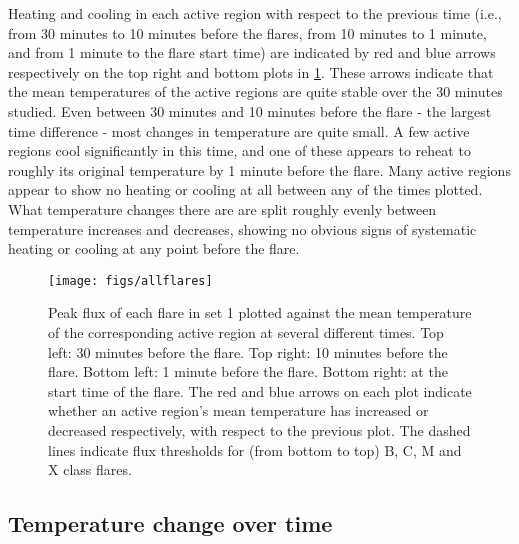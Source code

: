 \documentclass{article}
\begin{document}
Heating and cooling in each active region with respect to the previous
time (i.e., from 30 minutes to 10 minutes before the flares, from
10 minutes to 1 minute, and from 1 minute to the flare start time)
are indicated by red and blue arrows respectively on the top right
and bottom plots in \ref{fig:flux-v-temp}. These arrows indicate
that the mean temperatures of the active regions are quite stable
over the 30 minutes studied. Even between 30 minutes and 10 minutes
before the flare - the largest time difference - most changes in temperature
are quite small. A few active regions cool significantly in this time,
and one of these appears to reheat to roughly its original temperature
by 1 minute before the flare. Many active regions appear to show no
heating or cooling at all between any of the times plotted. What temperature
changes there are are split roughly evenly between temperature increases
and decreases, showing no obvious signs of systematic heating or cooling
at any point before the flare.

\begin{figure}
\begin{centering}
\texttt{[image: figs/allflares]} 
\par\end{centering}

\caption{Peak flux of each flare in set 1 plotted against the mean temperature
of the corresponding active region at several different times. Top
left: 30 minutes before the flare. Top right: 10 minutes before the
flare. Bottom left: 1 minute before the flare. Bottom right: at the
start time of the flare. The red and blue arrows on each plot indicate
whether an active region's mean temperature has increased or decreased
respectively, with respect to the previous plot. The dashed lines
indicate flux thresholds for (from bottom to top) B, C, M and X class
flares. \label{fig:flux-v-temp}}
\end{figure}



\subsection{Temperature change over time}
\end{document}
